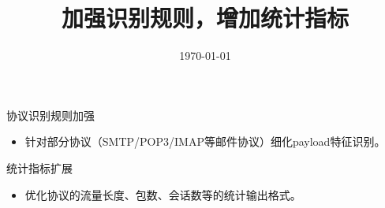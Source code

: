 \documentclass{article}
\title{加强识别规则，增加统计指标}
\author{}
\date{\today}
\begin{document}
\maketitle

协议识别规则加强
\begin{itemize}
    \item 针对部分协议（SMTP/POP3/IMAP等邮件协议）细化payload特征识别。
\end{itemize}

统计指标扩展
\begin{itemize}
    \item 优化协议的流量长度、包数、会话数等的统计输出格式。
\end{itemize}
\end{document}

